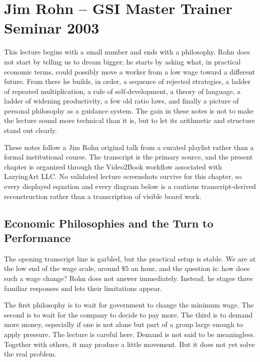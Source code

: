 \chapter{Jim Rohn -- GSI Master Trainer Seminar 2003}

This lecture begins with a small number and ends with a philosophy. Rohn does not start by telling us to dream bigger; he starts by asking what, in practical economic terms, could possibly move a worker from a low wage toward a different future. From there he builds, in order, a sequence of rejected strategies, a ladder of repeated multiplication, a rule of self-development, a theory of language, a ladder of widening productivity, a few old ratio laws, and finally a picture of personal philosophy as a guidance system. The gain in these notes is not to make the lecture sound more technical than it is, but to let its arithmetic and structure stand out clearly.

\begin{remark}
These notes follow a Jim Rohn original talk from a curated playlist rather than a formal institutional course. The transcript is the primary source, and the present chapter is organized through the Video2Book workflow associated with LazyingArt LLC. No validated lecture screenshots survive for this chapter, so every displayed equation and every diagram below is a cautious transcript-derived reconstruction rather than a transcription of visible board work.
\end{remark}

\section{Economic Philosophies and the Turn to Performance}

The opening transcript line is garbled, but the practical setup is stable. We are at the low end of the wage scale, around \(\$5\) an hour, and the question is: how does such a wage change? Rohn does not answer immediately. Instead, he stages three familiar responses and lets their limitations appear.

The first philosophy is to wait for government to change the minimum wage. The second is to wait for the company to decide to pay more. The third is to demand more money, especially if one is not alone but part of a group large enough to apply pressure. The lecture is careful here. Demand is not said to be meaningless. Together with others, it may produce a little movement. But it does not yet solve the real problem.

